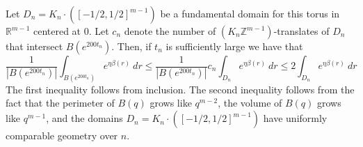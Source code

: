 \documentclass[10pt,reqno]{amsart}
\theoremstyle{Theorem}
\newtheorem{claim}[theorem]{Claim}
\theoremstyle{definition}
\theoremstyle{remark}
\newcommand{\note}[1]{\marginpar{{\color{red}\footnotesize \begin{spacing}{1}#1\end{spacing}}}}
\newcommand{\R}{\mathbb {R}}
\newcommand{\Z}{\mathbb {Z}}
\def\red{\color{red}}
\def\blue{}
\begin{document}
Let $D_n = K_n \cdot ( [-1/2,1/2]^{m-1})$ be a fundamental domain for this torus in $\R^{m-1}$ centered at $0$.
Let $c_n$ denote the number of $(K_n\Z^{m-1})$-translates of $D_n$ that intersect $B(e^{200t_n})$.
Then, if $t_n$ is sufficiently large we have that
\begin{equation*}
 \frac{1}{|B(e^{200 t_n})|}\int_{B(e^{200t_n})} e^{\eta \beta(r)} \ dr
  \le
  \frac{1}{|B(e^{200 t_n})|}c_n \int_{D_n} e^{\eta \beta(r)} \ dr
  \le 2\int_{D_n} e^{\eta \beta(r)} \ dr
 \end{equation*}
 The first inequality follows from inclusion.  The second inequality follows from the fact that the perimeter of $B(q)$ grows like $q^{m-2}$, the volume of $B(q)$ grows like $q^{m-1}$, and the domains $D_n = K_n  \cdot ( [-1/2,1/2]^{m-1})$ have uniformly comparable geometry over $n$.





%
%
%
\end{document}
